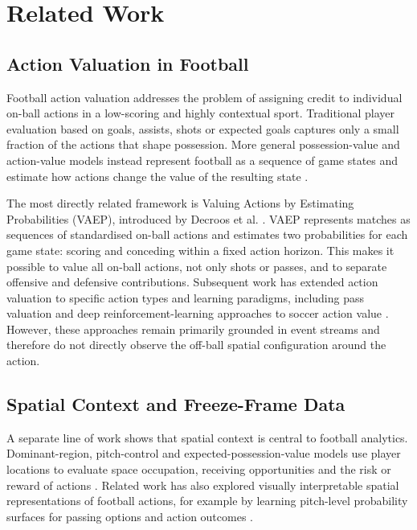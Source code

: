 \documentclass[runningheads]{llncs}
\begin{document}
\section{Related Work}

\subsection{Action Valuation in Football}

Football action valuation addresses the problem of assigning credit to individual on-ball actions in a low-scoring and highly contextual sport. Traditional player
evaluation based on goals, assists, shots or expected goals captures only a small fraction of the actions that shape possession. More general possession-value and
action-value models instead represent football as a sequence of game states and estimate how actions change the value of the resulting state \cite{decroos2019actions,liu2020deep}.

The most directly related framework is Valuing Actions by Estimating Probabilities (VAEP), introduced by Decroos et al. \cite{decroos2019actions}. VAEP represents matches as sequences of standardised on-ball actions and estimates two probabilities for each game state: scoring and conceding within a fixed action horizon. This makes it possible to value all on-ball actions, not only shots or passes, and to separate offensive and defensive contributions. Subsequent work has extended action valuation to specific action types and learning paradigms, including pass valuation \cite{bransen2019passes} and deep reinforcement-learning approaches to soccer action value \cite{liu2020deep}. However, these approaches remain primarily grounded in event streams and therefore do not directly observe the off-ball spatial configuration around the action.

\subsection{Spatial Context and Freeze-Frame Data}

A separate line of work shows that spatial context is central to football analytics. Dominant-region, pitch-control and expected-possession-value models use player locations to evaluate space occupation, receiving opportunities and the risk or reward of actions \cite{taki2000dominant,spearman2018beyond,power2017passes,fernandez2018wide,fernandez2021framework}. Related work has also explored visually interpretable spatial representations of football actions, for example by learning pitch-level probability surfaces for passing
options and action outcomes \cite{fernandez2021soccermap}.
\end{document}
